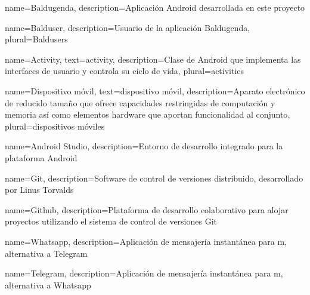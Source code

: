 {
    name=Baldugenda,
    description={Aplicaci\'on Android desarrollada en este proyecto} 
}

{
    name=Balduser,
    description={Usuario de la aplicaci\'on Baldugenda},
    plural={Baldusers}
}

{
    name=Activity,
    text={activity},
    description={Clase de Android que implementa las interfaces de usuario y controla su ciclo de vida},
    plural={activities}
}

{
    name=Dispositivo móvil,
    text={dispositivo móvil},
    description={Aparato electrónico de reducido tamaño que ofrece capacidades restringidas de computación y memoria así como elementos hardware que aportan funcionalidad al conjunto},
    plural={dispositivos móviles}
}

{
    name=Android Studio,
    description={Entorno de desarrollo integrado para la plataforma Android}
}

{
    name=Git,
    description={Software de control de versiones distribuido, desarrollado por Linus Torvalds}
}

{
    name=Github,
    description={Plataforma de desarrollo colaborativo para alojar proyectos utilizando el sistema de control de versiones \gls{Git}}
}

{
    name=Whatsapp,
    description={Aplicaci\'on de mensajería instant\'anea para m, alternativa a Telegram}
}

{
    name=Telegram,
    description={Aplicaci\'on de mensajería instant\'anea para m, alternativa a Whatsapp}
}










